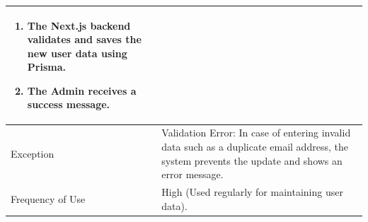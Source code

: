 \begin{table}[H]
\begin{tabularx}{\textwidth}{|l|X|}
\begin{enumerate}[nosep, leftmargin=*]
            \item The Next.js backend validates and saves the new user data using Prisma.
            \item The Admin receives a success message.
        \end{enumerate} \\ \hline
        Exception & {Validation Error:} In case of entering invalid data such as a duplicate email address, the system prevents the update and shows an error message. \\ \hline
        Frequency of Use & High (Used regularly for maintaining user data). \\ \hline
    \end{tabularx}
\end{table}
